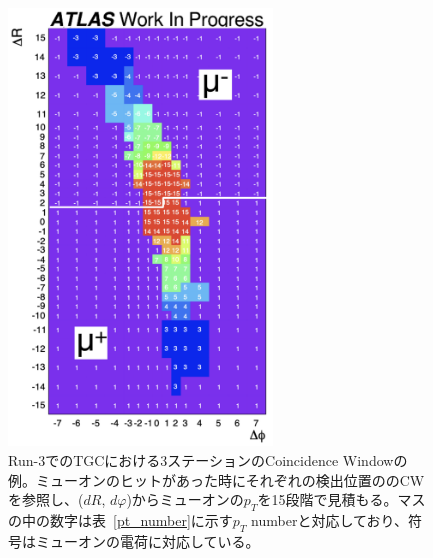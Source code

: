 
\begin{figure}[tb]
  \centering
  \includegraphics[clip, width=7cm]{fig/3/cw_run3_shiomi.png}
  \caption{Run-3でのTGCにおける3ステーションのCoincidence Windowの例\cite{article:shiomi-mron}。ミューオンのヒットがあった時にそれぞれの検出位置ののCWを参照し、($dR$, $dφ$)からミューオンの$p_T$を15段階で見積もる。マスの中の数字は表~\ref{pt_number}に示す$p_T$ numberと対応しており、符号はミューオンの電荷に対応している。}
  \label{fig:CW}
\end{figure}

